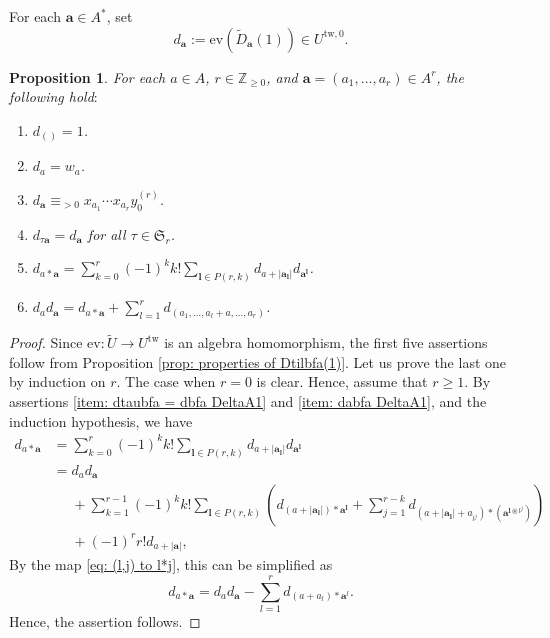 \documentclass[12pt,a4paper]{amsart}
\newtheorem{prop}[thm]{Proposition}
\theoremstyle{definition}
\numberwithin{equation}{subsection}
\begin{document}
For each $\mathbf{a} \in A^*$, set
\[
  d_\mathbf{a} := \mathrm{ev}(\tilde{D}_\mathbf{a}(1)) \in U^{\mathrm{tw}, 0}.
\]

\begin{prop}\label{prop: properties of dbfa DeltaA1}
  For each $a \in A$, $r \in \mathbb{Z}_{\geq 0}$, and $\mathbf{a} = (a_1,\dots,a_r) \in A^r$, the following hold$:$
  \begin{enumerate}
    \item $d_{()} = 1$.
    \item $d_a = w_a$.
    \item\label{item: dbfa equiv xy DeltaA1} $d_\mathbf{a} \equiv_{> 0} x_{a_1} \cdots x_{a_r} y_0^{(r)}$.
    \item\label{item: dtaubfa = dbfa DeltaA1} $d_{\tau\mathbf{a}} = d_\mathbf{a}$ for all $\tau \in \mathfrak{S}_r$.
    \item\label{item: dabfa DeltaA1} $d_{a*\mathbf{a}} = \sum_{k=0}^r (-1)^k k! \sum_{\mathbf{l} \in P(r,k)} d_{a+|\mathbf{a}_\mathbf{l}|} d_{\mathbf{a}^\mathbf{l}}$.
    \item $d_a d_\mathbf{a} = d_{a*\mathbf{a}} + \sum_{l=1}^r d_{(a_1,\dots,a_l+a,\dots,a_r)}$.
  \end{enumerate}
\end{prop}
\begin{proof}
  Since $\mathrm{ev} : \tilde{U} \to U^\mathrm{tw}$ is an algebra homomorphism, the first five assertions follow from Proposition \ref{prop: properties of Dtilbfa(1)}.
  Let us prove the last one by induction on $r$.
  The case when $r = 0$ is clear.
  Hence, assume that $r \geq 1$.
  By assertions \eqref{item: dtaubfa = dbfa DeltaA1} and \eqref{item: dabfa DeltaA1}, and the induction hypothesis, we have
  \begin{align*}
    d_{a*\mathbf{a}}
    &=
    \sum_{k=0}^r (-1)^k k! \sum_{\mathbf{l} \in P(r,k)} d_{a+|\mathbf{a}_\mathbf{l}|} d_{\mathbf{a}^\mathbf{l}}\\
    &=
    d_{a} d_\mathbf{a}\\
    &\phantom{=} + \sum_{k=1}^{r-1} (-1)^k k! \sum_{\mathbf{l} \in P(r,k)} (
      d_{(a+|\mathbf{a}_\mathbf{l}|)*\mathbf{a}^\mathbf{l}}
      + \sum_{j=1}^{r-k} d_{(a+|\mathbf{a}_\mathbf{l}|+a_{l^j})*(\mathbf{a}^{\mathbf{l} \circledast l^j})}
    )\\
    &\phantom{=} + (-1)^r r! d_{a+|\mathbf{a}|},
  \end{align*}
  By the map \eqref{eq: (l,j) to l*j}, this can be simplified as
  \[
    d_{a*\mathbf{a}} = d_{a} d_{\mathbf{a}} - \sum_{l=1}^r d_{(a+a_l)*\mathbf{a}^l}.
  \]
  Hence, the assertion follows.
\end{proof}
\end{document}
